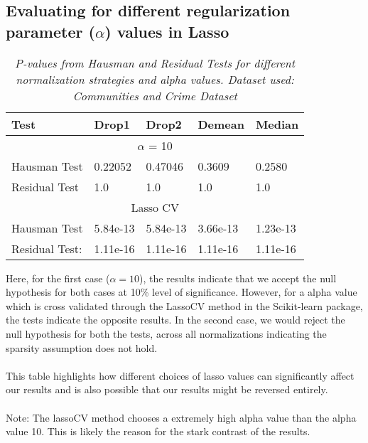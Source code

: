\subsection{Evaluating for different regularization parameter ($\alpha$) values in Lasso}
\begin{table}[h!]
\renewcommand{\arraystretch}{1.5}
\centering
\begin{tabular}{||l l l l l||} 
 \hline
 \hline
 Test & Drop1 & Drop2 &  Demean & Median \\ [0.5ex] 
 \hline \hline
 \multicolumn{5}{||c||}{$\alpha$ = 10} \\ [0.5ex]
 Hausman Test & 0.22052 & 0.47046 & 0.3609 & 0.2580 \\ 
 Residual Test & 1.0 & 1.0 & 1.0 & 1.0 \\
 \hline
 \multicolumn{5}{||c||}{Lasso CV} \\ [0.5ex]
 Hausman Test & 5.84e-13 & 5.84e-13 & 3.66e-13 & 1.23e-13 \\ 
 Residual Test: & 1.11e-16 & 1.11e-16  & 1.11e-16 & 1.11e-16 \\ [1ex] 
 \hline \hline
\end{tabular}
\caption{\textit{P-values from Hausman and Residual Tests for different normalization strategies and alpha values. Dataset used: Communities and Crime Dataset}}
\label{table:1}
\end{table}


Here, for the first case ($\alpha = 10$), the results indicate that we accept the null hypothesis for both cases at 10\% level of significance. However, for a alpha value which is cross validated through the LassoCV method in the Scikit-learn package, the tests indicate the opposite results. In the second case, we would reject the null hypothesis for both the tests, across all normalizations indicating the sparsity assumption does not hold.\\ 
\\
This table highlights how different choices of lasso values can significantly affect our results and is also possible that our results might be reversed entirely. \\
\\
Note: The lassoCV method chooses a extremely high alpha value than the alpha value 10. This is likely the reason for the stark contrast of the results. 